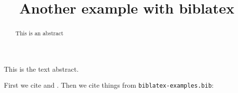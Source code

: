\documentclass[version=final,biblatex]{iacrcc}
\title{Another example with biblatex}
\begin{document}
\maketitle
\begin{abstract}
  This is an abstract
\end{abstract}
\begin{textabstract}
  This is the text abstract.
\end{textabstract}
First we cite \cite{sample} and \cite{noemph}.
Then we cite things from \texttt{biblatex-examples.bib}: 
\cite{kowalik}
\cite{westfahl:space}
\cite{aksin}
\cite{angenendt}
\cite{baez/article}
\cite{bertram}
\cite{doody}
\cite{matuz:doody}
\cite{gillies}
\cite{glashow}
\cite{herrmann}
\cite{kastenholz}
\cite{murray}
\cite{reese}
\cite{sarfraz}
\cite{shore}
\cite{sigfridsson}
\cite{spiegelberg}
\cite{springer}
\cite{weinberg}
\cite{yoon}
\cite{augustine}
\cite{averroes/bland}
\cite{averroes/hannes}
\cite{averroes/hercz}
\cite{cicero}
\cite{coleridge}
\cite{companion}
\cite{cotton}
\cite{gerhardt}
\cite{gonzalez}
\cite{hammond}
\cite{iliad}
\cite{knuth:ct:a}
\cite{knuth:ct:b}
\cite{knuth:ct:c}
\cite{knuth:ct:d}
\cite{knuth:ct:e}
\cite{kullback}
\cite{kullback:reprint}
\cite{malinowski}
\cite{maron}
\cite{massa}
\cite{moore}
\cite{nietzsche:ksa}
\cite{nietzsche:ksa1}
\cite{nussbaum}
\cite{piccato}
\cite{vangennep}
\cite{vangennep:trans}
\cite{wilde}
\cite{worman}
\cite{britannica}
\cite{gaonkar}
\cite{gaonkar:in}
\cite{westfahl:frontier}
\cite{kant:kpv}
\cite{kant:ku}
\cite{nietzsche:historie}
\cite{brandt}
\cite{hyman}
\cite{pines}
\cite{salam}
\cite{cms}
\cite{baez/online}
\cite{ctan}
\cite{itzhaki}
\cite{markey}
\cite{wassenberg}
\cite{almendro}
\cite{kowalik}
\cite{laufenberg}
\cite{sorace}
\cite{jcg}
\cite{chiu}
\cite{padhye}
\cite{geer}
\cite{loh}
\cite{deNeville1999}
\cite{vanDyke2007}
\cite{DickVanDyke2015}

\printbibliography
\end{document}
